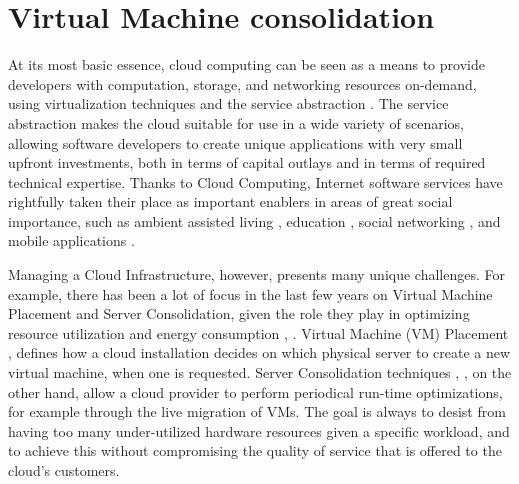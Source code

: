 
\section{Virtual Machine consolidation}
\label{sec:sota_vm_cons}

At its most basic essence, cloud computing can be seen as a means to provide developers with computation, storage, and networking resources on-demand, using virtualization techniques and the service abstraction \cite{Armbrust:2010ee}. The service abstraction makes the cloud suitable for use in a wide variety of scenarios, allowing software developers to create unique applications with very small upfront investments, both in terms of capital outlays and in terms of required technical expertise. Thanks to Cloud Computing, Internet software services have rightfully taken their place as important enablers in areas of great social importance, such as ambient assisted living \cite{Zhang:2011dq}, education \cite{Sultan:2010fd}, social networking \cite{Chard:2010eh}, and mobile applications \cite{Fernando:2013ip}.

Managing a Cloud Infrastructure, however, presents many unique challenges. For example, there has been a lot of focus in the last few years on Virtual Machine Placement and Server Consolidation, given the role they play in optimizing resource utilization and energy consumption \cite{Feller:2012kf}, \cite{Goudarzi:2012gw}. Virtual Machine (VM) Placement \cite{Meng:2010im}, \cite{Xu:2010df} defines how a cloud installation decides on which physical server to create a new virtual machine, when one is requested. Server Consolidation techniques \cite{Wuhib:2012vq}, \cite{Corradi:2014fe}, on the other hand, allow a cloud provider to perform periodical run-time optimizations, for example through the live migration of VMs. The goal is always to desist from having too many under-utilized hardware resources given a specific workload, and to achieve this without compromising the quality of service that is offered to the cloud’s customers.


